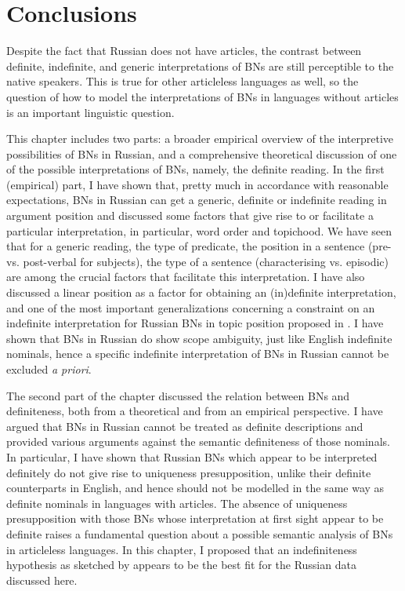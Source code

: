 \documentclass[output=paper,colorlinks,citecolor=brown]{langscibook}
\begin{document}
\section{Conclusions} \label{conclusions}

Despite the fact that Russian does not have articles, the contrast between definite, indefinite, and generic interpretations of BNs are still perceptible to the native speakers. This is true for other articleless languages as well, so the question of how to model the interpretations of BNs in languages without articles is an important linguistic question. 

This chapter includes two parts: a broader empirical overview of the interpretive possibilities of BNs in Russian, and a comprehensive theoretical discussion of one of the possible interpretations of BNs, namely, the definite reading. In the first (empirical) part, I have shown that, pretty much in accordance with reasonable expectations, BNs in Russian can get a generic, definite or indefinite reading in argument position and discussed some factors that give rise to or facilitate a particular interpretation, in particular, word order and topichood. We have seen that for a generic reading, the type of predicate, the position in a sentence (pre- vs. post-verbal for subjects), the type of a sentence (characterising vs. episodic) are among the crucial factors that facilitate this interpretation. I have also discussed a linear position as a factor for obtaining an (in)definite interpretation, and one of the most important generalizations concerning a constraint on an indefinite interpretation for Russian BNs in topic position proposed in \citet{geist10}. I have shown that BNs in Russian do show scope ambiguity, just like English indefinite nominals, hence a specific indefinite interpretation of BNs in Russian cannot be excluded \textit{a priori}. %

The second part of the chapter discussed the relation between BNs and definiteness, both from a theoretical and from an empirical perspective. I have argued that BNs in Russian cannot be treated as definite descriptions and provided various arguments against the semantic definiteness of those nominals. In particular, I have shown that Russian BNs which appear to be interpreted definitely do not give rise to uniqueness presupposition, unlike their definite counterparts in English, and hence should not be modelled in the same way as definite nominals in languages with articles. The absence of uniqueness presupposition with those BNs whose interpretation at first sight appear to be definite raises a fundamental question about a possible semantic analysis of BNs in articleless languages. In this chapter, I proposed that an indefiniteness hypothesis as sketched by \citet{Heim2011} appears to be the best fit for the Russian data discussed here. 
\end{document}
